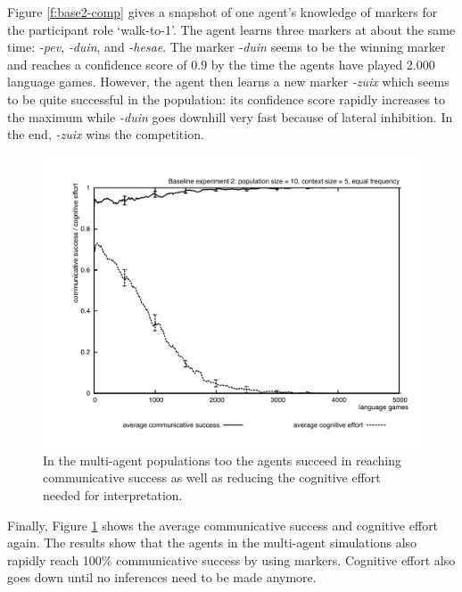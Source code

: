 Figure \ref{f:base2-comp} gives a snapshot of one agent's knowledge of markers for the participant role `walk-to-1'. The agent learns three markers at about the same time: {\em -pev}, {\em -duin}, and {\em -hesae}. The marker {\em -duin} seems to be the winning marker and reaches a confidence score of 0.9 by the time the agents have played 2.000 language games. However, the agent then learns a new marker {\em -zuix} which seems to be quite successful in the population: its confidence score rapidly increases to the maximum while {\em -duin} goes downhill very fast because of lateral inhibition. In the end, {\em -zuix} wins the competition. 
\begin{figure}[t]
\centerline{\includegraphics[width=\textwidth]{Chapter3/figs/graph-base2-effort2}}
  \caption[Baseline experiment 2: success and effort (equal frequency)]{In the multi-agent populations too the agents succeed in reaching communicative success as well as reducing the cognitive effort needed for interpretation.}
   \label{f:base2-effort2}
\end{figure}

Finally, Figure \ref{f:base2-effort2} shows the average communicative success and cognitive effort again. The results show that the agents in the multi-agent simulations also rapidly reach 100\% communicative success by using markers. Cognitive effort also goes down until no inferences need to be made anymore.



